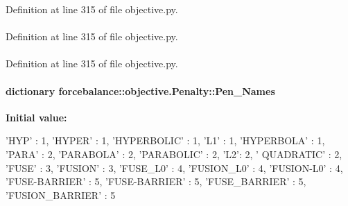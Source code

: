\-Definition at line 315 of file objective.\-py.

\hypertarget{classforcebalance_1_1objective_1_1Penalty_a1280094f47322c26c0ed2327d55d2bf9}{
\paragraph[{\-F\-F}]{}}\label{classforcebalance_1_1objective_1_1Penalty_a1280094f47322c26c0ed2327d55d2bf9}


\-Definition at line 315 of file objective.\-py.

\hypertarget{classforcebalance_1_1objective_1_1Penalty_a817fa1ce79cc4658d81e7e1d628dad00}{
\paragraph[{fmul}]{}}\label{classforcebalance_1_1objective_1_1Penalty_a817fa1ce79cc4658d81e7e1d628dad00}


\-Definition at line 315 of file objective.\-py.

\hypertarget{classforcebalance_1_1objective_1_1Penalty_aad5192e4b92742dbe94fceb4144cebf9}{
\paragraph[{\-Pen\-\_\-\-Names}]{\setlength{\rightskip}{0pt plus 5cm}dictionary {\bf forcebalance\-::objective.\-Penalty\-::\-Pen\-\_\-\-Names}}}\label{classforcebalance_1_1objective_1_1Penalty_aad5192e4b92742dbe94fceb4144cebf9}
{\bfseries \-Initial value\-:}
\begin{DoxyCode}
{'HYP' : 1, 'HYPER' : 1, 'HYPERBOLIC' : 1, 'L1' : 1, 'HYPERBOLA' : 1,
                      'PARA' : 2, 'PARABOLA' : 2, 'PARABOLIC' : 2, 'L2': 2, '
      QUADRATIC' : 2,
                      'FUSE' : 3, 'FUSION' : 3, 'FUSE_L0' : 4, 'FUSION_L0' : 4,
       'FUSION-L0' : 4,
                      'FUSE-BARRIER' : 5, 'FUSE-BARRIER' : 5, 'FUSE_BARRIER' : 
      5, 'FUSION_BARRIER' : 5}
\end{DoxyCode}


